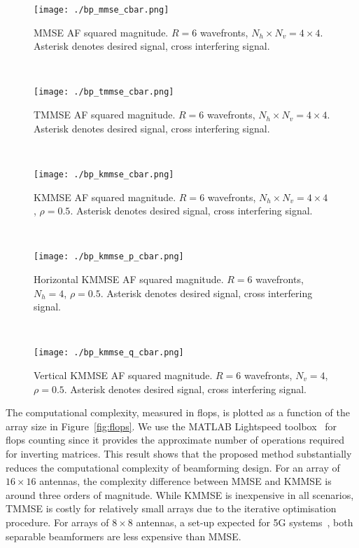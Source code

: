\documentclass{cta-author}
\begin{document}
\begin{figure}[tb]
	\centering
	\texttt{[image: ./bp\_mmse\_cbar.png]}
	\caption{MMSE AF squared magnitude. $R=6$ wavefronts, $N_h \times N_v = 4 \times 4$. Asterisk denotes desired signal, cross interfering signal.}	
	\label{fig:bp_mmse}
\end{figure}
~
\begin{figure}[tb]
	\centering
	\texttt{[image: ./bp\_tmmse\_cbar.png]}
	\caption{TMMSE AF squared magnitude. $R=6$ wavefronts, $N_h \times N_v = 4 \times 4$. Asterisk denotes desired signal, cross interfering signal.}	
	\label{fig:bp_tmmse}	
\end{figure}
~
\begin{figure}[tb]
	\centering
	\texttt{[image: ./bp\_kmmse\_cbar.png]}
	\caption{KMMSE AF squared magnitude. $R=6$ wavefronts, $N_h \times N_v = 4 \times 4$, $\rho=0.5$. Asterisk denotes desired signal, cross interfering signal.}	
	\label{fig:bp_kmmse}	
\end{figure}
~
\begin{figure}[tb]
	\centering
	\texttt{[image: ./bp\_kmmse\_p\_cbar.png]}
	\caption{Horizontal KMMSE AF squared magnitude. $R=6$ wavefronts, $N_h= 4$, $\rho=0.5$. Asterisk denotes desired signal, cross interfering signal.}
	\label{fig:bp_kmmse_p}	
\end{figure}
~
\begin{figure}[tb]
	\centering
	\texttt{[image: ./bp\_kmmse\_q\_cbar.png]}
	\caption{Vertical KMMSE AF squared magnitude. $R=6$ wavefronts, $N_v =4$, $\rho=0.5$. Asterisk denotes desired signal, cross interfering signal.}	
	\label{fig:bp_kmmse_q}		
\end{figure}

The computational complexity, measured in flops, is plotted as a function of the array size in Figure~\ref{fig:flops}. We use the MATLAB Lightspeed toolbox~\cite{minka_lightspeed_2007} for flops counting since it provides the approximate number of operations required for inverting matrices. This result shows that the proposed method substantially reduces the computational complexity of beamforming design. For an array of $16\times 16$ antennas, the complexity difference between MMSE and KMMSE is around three orders of magnitude. While KMMSE is inexpensive in all scenarios, TMMSE is costly for relatively small arrays due to the iterative optimisation procedure. For arrays of $8\times 8$ antennas, a set-up expected for 5G systems~\cite{ji_overview_2017}, both separable beamformers are less expensive than MMSE.
\end{document}
